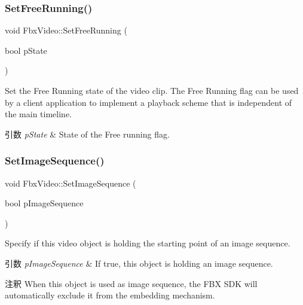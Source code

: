 \subsubsection{\texorpdfstring{Set\+Free\+Running()}{SetFreeRunning()}}
{\footnotesize\ttfamily void Fbx\+Video\+::\+Set\+Free\+Running (\begin{DoxyParamCaption}\item[{bool}]{p\+State }\end{DoxyParamCaption})}

Set the Free Running state of the video clip. The Free Running flag can be used by a client application to implement a playback scheme that is independent of the main timeline. 
\begin{DoxyParams}{引数}
{\em p\+State} & State of the Free running flag. \\
\hline
\end{DoxyParams}
\mbox{\label{class_fbx_video_a511c7cfc220c659c6d07cb4b891572ae}} 
\subsubsection{\texorpdfstring{Set\+Image\+Sequence()}{SetImageSequence()}}
{\footnotesize\ttfamily void Fbx\+Video\+::\+Set\+Image\+Sequence (\begin{DoxyParamCaption}\item[{bool}]{p\+Image\+Sequence }\end{DoxyParamCaption})}

Specify if this video object is holding the starting point of an image sequence. 
\begin{DoxyParams}{引数}
{\em p\+Image\+Sequence} & If {\ttfamily true}, this object is holding an image sequence. \\
\hline
\end{DoxyParams}
\begin{DoxyRemark}{注釈}
When this object is used as image sequence, the F\+BX S\+DK will automatically exclude it from the embedding mechanism. 
\end{DoxyRemark}
\mbox{\label{class_fbx_video_a32c2bbbd3fdcfc4d653e14067d92e552}} 
